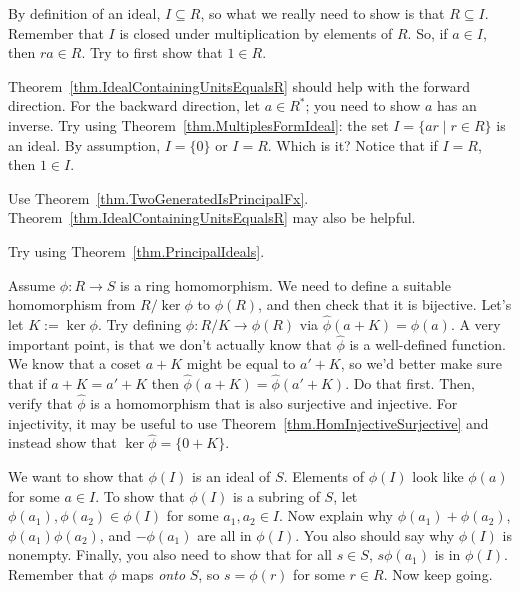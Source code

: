 \begin{hint*}
By definition of an ideal, $I \subseteq R$, so what we really need to show is that $R \subseteq I$. Remember that $I$ is closed under multiplication by elements of $R$. So, if $a\in I$, then $ra\in R$. Try to first show that $1\in R$. 
\end{hint*}

\begin{hint*}
Theorem~\ref{thm.IdealContainingUnitsEqualsR} should help with the forward direction. For the backward direction, let $a\in R^*$; you need to show $a$ has an inverse. Try using Theorem~\ref{thm.MultiplesFormIdeal}: the set $I = \{ar\mid r\in R\}$ is an ideal. By assumption, $I = \{0\}$ or $I=R$. Which is it? Notice that if $I=R$, then $1\in I$.
\end{hint*}

\begin{hint*}
Use Theorem~\ref{thm.TwoGeneratedIsPrincipalFx}. Theorem~\ref{thm.IdealContainingUnitsEqualsR} may also be helpful.
\end{hint*}

\begin{hint*}
Try using Theorem~\ref{thm.PrincipalIdeals}.
\end{hint*}

\begin{hint*}
Assume $\phi:R\to S$ is a ring homomorphism. We need to define a suitable homomorphism from $R/\ker\phi$ to  $\phi(R)$, and then check that it is bijective. Let's let $K:= \ker\phi$. Try defining $\hat{\phi}:R/K\to\phi(R)$ via $\hat{\phi}(a+K) = \phi(a)$. A very important point, is that we don't actually know that $\hat{\phi}$ is a well-defined function. We know that a coset $a+K$ might be equal to $a'+K$, so we'd better make sure that if $a+K=a'+K$ then $\hat{\phi}(a+K) = \hat{\phi}(a'+K)$. Do that first. Then, verify that $\hat{\phi}$ is a homomorphism that is also surjective and injective. For injectivity, it may be useful to use Theorem~\ref{thm.HomInjectiveSurjective} and instead show that $\ker \hat{\phi} = \{0+K\}$.
\end{hint*}

\begin{hint*}
We want to show that $\phi(I)$ is an ideal of $S$. Elements of $\phi(I)$ look like $\phi(a)$ for some $a\in I$. To show that $\phi(I)$ is a subring of $S$, let  $\phi(a_1), \phi(a_2) \in \phi(I)$ for some $a_1,a_2\in I$. Now explain why $\phi(a_1)+\phi(a_2)$, $\phi(a_1)\phi(a_2)$, and $-\phi(a_1)$ are all in $\phi(I)$. You also should say why  $\phi(I)$ is nonempty. Finally, you also need to show that for all $s\in S$, $s\phi(a_1)$ is in $\phi(I)$. Remember that $\phi$ maps \emph{onto} $S$, so $s = \phi(r)$ for some $r\in R$. Now keep going.
\end{hint*}

